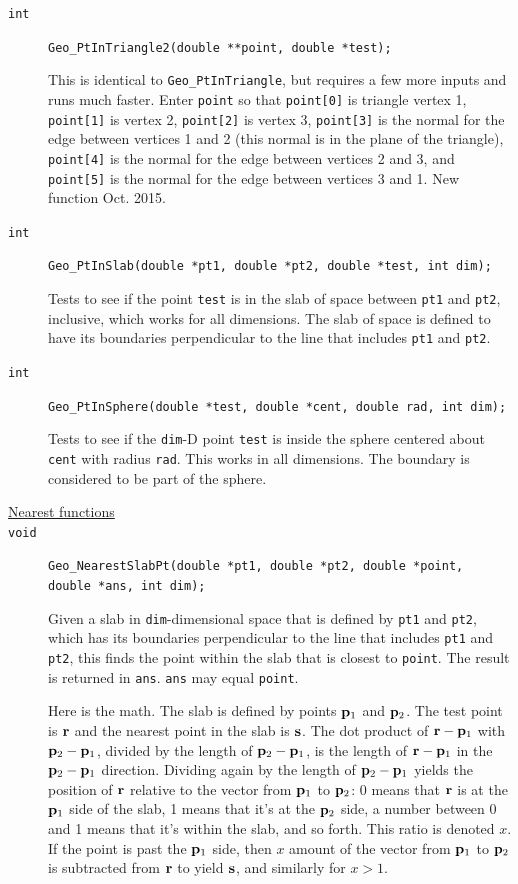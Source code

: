 \documentclass[11pt]{article}
\newcommand {\ttt} {\texttt}
\begin{document}
\begin{description}
\item[\ttt{int}]
\ttt{Geo\_PtInTriangle2(double **point, double *test);}

This is identical to \ttt{Geo\_PtInTriangle}, but requires a few more inputs and runs much faster. Enter \ttt{point} so that \ttt{point[0]} is triangle vertex 1, \ttt{point[1]} is vertex 2, \ttt{point[2]} is vertex 3, \ttt{point[3]} is the normal for the edge between vertices 1 and 2 (this normal is in the plane of the triangle), \ttt{point[4]} is the normal for the edge between vertices 2 and 3, and \ttt{point[5]} is the normal for the edge between vertices 3 and 1. New function Oct. 2015.

\item[\ttt{int}]
\ttt{Geo\_PtInSlab(double *pt1, double *pt2, double *test, int dim);}

Tests to see if the point \ttt{test} is in the slab of space between \ttt{pt1} and \ttt{pt2}, inclusive, which works for all dimensions. The slab of space is defined to have its boundaries perpendicular to the line that includes \ttt{pt1} and \ttt{pt2}.

\item[\ttt{int}]
\ttt{Geo\_PtInSphere(double *test, double *cent, double rad, int dim);}

Tests to see if the \ttt{dim}-D point \ttt{test} is inside the sphere centered about \ttt{cent} with radius \ttt{rad}. This works in all dimensions. The boundary is considered to be part of the sphere.

\item[\underline{Nearest functions}]

\item[\ttt{void}]
\ttt{Geo\_NearestSlabPt(double *pt1, double *pt2, double *point, double *ans, int dim);}

Given a slab in \ttt{dim}-dimensional space that is defined by \ttt{pt1} and \ttt{pt2}, which has its boundaries perpendicular to the line that includes \ttt{pt1} and \ttt{pt2}, this finds the point within the slab that is closest to \ttt{point}. The result is returned in \ttt{ans}. \ttt{ans} may equal \ttt{point}.

Here is the math. The slab is defined by points $\vb{p}_1$ and $\vb{p}_2$. The test point is $\vb{r}$ and the nearest point in the slab is $\vb{s}$. The dot product of $\vb{r}-\vb{p}_1$ with $\vb{p}_2-\vb{p}_1$, divided by the length of $\vb{p}_2-\vb{p}_1$, is the length of $\vb{r}-\vb{p}_1$ in the $\vb{p}_2-\vb{p}_1$ direction. Dividing again by the length of $\vb{p}_2-\vb{p}_1$ yields the position of $\vb{r}$ relative to the vector from $\vb{p}_1$ to $\vb{p}_2$: 0 means that $\vb{r}$ is at the $\vb{p}_1$ side of the slab, 1 means that it's at the $\vb{p}_2$ side, a number between 0 and 1 means that it's within the slab, and so forth. This ratio is denoted $x$. If the point is past the $\vb{p}_1$ side, then $x$ amount of the vector from $\vb{p}_1$ to $\vb{p}_2$ is subtracted from $\vb{r}$ to yield $\vb{s}$, and similarly for $x > 1$.


\end{description}
\end{document}
